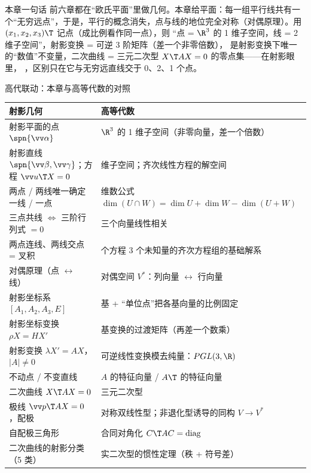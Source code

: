 \begin{intbox}{本章一句话}
前六章都在“欧氏平面”里做几何。本章给平面：每一组平行线共有一个“无穷远点”，于是，平行的概念消失，点与线的地位完全对称（对偶原理）。用 $(x_1,x_2,x_3)\T$ 记点（成比例看作同一点），则
“点 = $\R^3$ 的 1 维子空间，线 = 2 维子空间”，射影变换 = 可逆 3 阶矩阵（差一个非零倍数），
是射影变换下唯一的“数值”不变量，二次曲线 = 三元二次型 $X\T AX=0$ 的零点集——在射影眼里，
，区别只在它与无穷远直线交于 0、2、1 个点。
\end{intbox}

\begin{gdbox}{高代联动：本章与高等代数的对照}
\renewcommand{\arraystretch}{1.25}
\begin{tabularx}{\linewidth}{@{}>{\raggedright\arraybackslash}X>{\raggedright\arraybackslash}X@{}}
\toprule
\textbf{\sffamily 射影几何} & \textbf{\sffamily 高等代数}\\\midrule
射影平面的点 $\spn{\vv\alpha}$ & $\R^3$ 的 1 维子空间（非零向量，差一个倍数）\\
射影直线 $\spn{\vv\beta,\vv\gamma}$；方程 $\vv u\T X=0$ & 2 维子空间；齐次线性方程的解空间\\
两点 / 两线唯一确定一线 / 一点 & 维数公式 $\dim(U\cap W)=\dim U+\dim W-\dim(U+W)$\\
三点共线 $\iff$ 三阶行列式 $=0$ & 三个向量线性相关\\
两点连线、两线交点 = 叉积 & 2 个方程 3 个未知量的齐次方程组的基础解系\\
对偶原理（点 $\leftrightarrow$ 线） & 对偶空间 $V^*$：列向量 $\leftrightarrow$ 行向量\\
射影坐标系 $[A_1,A_2,A_3,E]$ & 基 + “单位点”把各基向量的比例固定\\
射影坐标变换 $\rho X=HX'$ & 基变换的过渡矩阵（再差一个数乘）\\
射影变换 $\lambda X'=AX$，$|A|\neq0$ & 可逆线性变换模去纯量：$PGL(3,\R)$\\
不动点 / 不变直线 & $A$ 的特征向量 / $A\T$ 的特征向量\\
二次曲线 $X\T AX=0$ & 三元二次型\\
极线 $\vv p\T AX=0$，配极 & 对称双线性型；非退化型诱导的同构 $V\to V^*$\\
自配极三角形 & 合同对角化 $C\T AC=\operatorname{diag}$\\
二次曲线的射影分类（5 类） & 实二次型的惯性定理（秩 + 符号差）\\
\bottomrule
\end{tabularx}
\end{gdbox}

